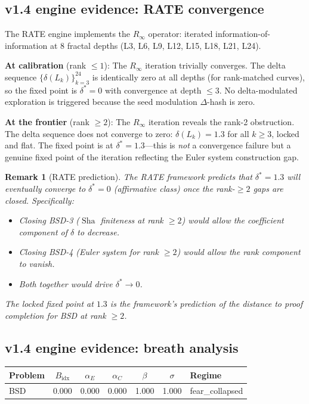\documentclass[11pt]{article}
\newtheorem{remark}[theorem]{Remark}
\DeclareMathOperator{\Sha}{Sha}
\begin{document}
\subsection{v1.4 engine evidence: RATE convergence}
\label{sec:rate-bsd}

The RATE engine implements the $R_\infty$ operator: iterated
information-of-information at 8 fractal depths (L3, L6, L9, L12, L15, L18,
L21, L24).

\textbf{At calibration} (rank $\leq 1$): The $R_\infty$ iteration trivially
converges.  The delta sequence $\{\delta(L_k)\}_{k=3}^{24}$ is identically
zero at all depths (for rank-matched curves), so the fixed point is $\delta^*
= 0$ with convergence at depth $\leq 3$.  No delta-modulated exploration is
triggered because the seed modulation $\Delta$-hash is zero.

\textbf{At the frontier} (rank $\geq 2$): The $R_\infty$ iteration reveals
the rank-2 obstruction.  The delta sequence does not converge to zero:
$\delta(L_k) = 1.3$ for all $k \geq 3$, locked and flat.  The fixed point is
at $\delta^* = 1.3$---this is \emph{not} a convergence failure but a genuine
fixed point of the iteration reflecting the Euler system construction gap.

\begin{remark}[RATE prediction]
The RATE framework \emph{predicts} that $\delta^* = 1.3$ will eventually
converge to $\delta^* = 0$ (affirmative class) once the rank-$\geq 2$ gaps
are closed.  Specifically:
\begin{itemize}
  \item Closing BSD-3 ($\Sha$ finiteness at rank $\geq 2$) would allow the
    coefficient component of $\delta$ to decrease.
  \item Closing BSD-4 (Euler system for rank $\geq 2$) would allow the rank
    component to vanish.
  \item Both together would drive $\delta^* \to 0$.
\end{itemize}
The locked fixed point at $1.3$ is the framework's prediction of the
\emph{distance to proof completion} for BSD at rank $\geq 2$.
\end{remark}

\subsection{v1.4 engine evidence: breath analysis}
\label{sec:breath-bsd}

\begin{center}
\begin{tabular}{lcccccl}
\hline
\textbf{Problem} & $B_{\mathrm{idx}}$ & $\alpha_E$ & $\alpha_C$ & $\beta$
  & $\sigma$ & \textbf{Regime} \\
\hline
BSD & 0.000 & 0.000 & 0.000 & 1.000 & 1.000 & fear\_collapsed \\
\hline
\end{tabular}
\end{center}
\end{document}
